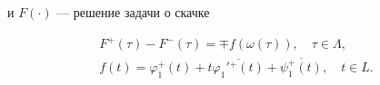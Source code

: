 \begin{lem}
и $F(\cdot)$ --- решение задачи о скачке


\begin{equation}


\begin{array}{c}


F^+(\tau)-F^-(\tau) = \mp f(\omega(\tau)),\quad \tau\in\Lambda, \\[2mm]


%


f(t) = \varphi_1^+(t)+t\overline{\varphi_1'{}^+(t)}+


\overline{\psi_1^+(t)},\quad t\in L.


\end{array}


\end{equation}


\end{lem}





